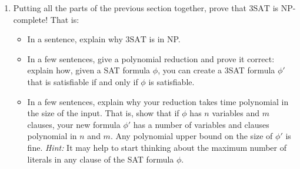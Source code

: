 \documentclass[12 pt, letterpaper]{hmcpset}
\newcommand{\NP}{\textsf{NP}}
\begin{document}
\begin{problem}
\begin{enumerate}[label = (\arabic*)]
\begin{enumerate}[label = (\roman*)]
    \emph{Hint:} when $k=5$, your formula should simplify to your expression from the previous part!

    \end{enumerate}
    
    \item Putting all the parts of the previous section together, prove that $\text{3SAT}$ is \NP-complete! That is:
    \begin{itemize}
        \item In a sentence, explain why $\text{3SAT}$ is in \NP.
        \item In a few sentences, give a polynomial reduction and prove it correct: explain how, given a SAT formula $\phi$, you can create a 3SAT formula $\phi'$ that is satisfiable if and only if $\phi$ is satisfiable. 
        \item In a few sentences, explain why your reduction takes time polynomial in the size of the input. That is, show that if $\phi$ has $n$ variables and $m$ clauses, your new formula $\phi'$ has a number of variables and clauses polynomial in $n$ and $m$. Any polynomial upper bound on the size of $\phi'$ is fine. \emph{Hint:} It may help to start thinking about the maximum number of literals in any clause of the SAT formula $\phi$.
    \end{itemize} 
\end{enumerate}
\end{problem}
\end{document}

